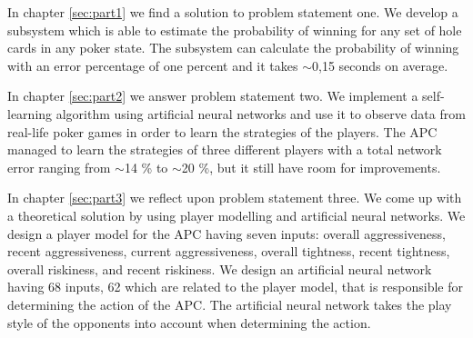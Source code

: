 In chapter \ref{sec:part1} we find a solution to problem statement one. We develop a subsystem which is able to estimate the probability of winning for any set of hole cards in any poker state. The subsystem can calculate the probability of winning with an error percentage of one percent and it takes $\sim$0,15 seconds on average.

In chapter \ref{sec:part2} we answer problem statement two. We implement a self-learning algorithm using artificial neural networks and use it to observe data from real-life poker games in order to learn the strategies of the players. The APC managed to learn the strategies of three different players with a total network error ranging from $\sim$14 \% to $\sim$20 \%, but it still have room for improvements.

In chapter \ref{sec:part3} we reflect upon problem statement three. We come up with a theoretical solution by using player modelling and artificial neural networks. We design a player model for the APC having seven inputs: overall aggressiveness, recent aggressiveness, current aggressiveness, overall tightness, recent tightness, overall riskiness, and recent riskiness. 
We design an artificial neural network having 68 inputs, 62 which are related to the player model, that is responsible for determining the action of the APC. The artificial neural network takes the play style of the opponents into account when determining the action.
